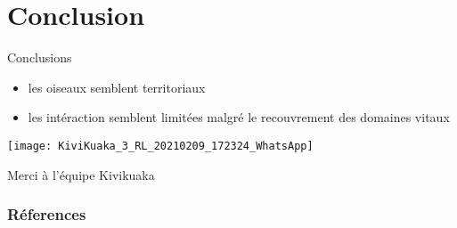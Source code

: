 \documentclass[10pt]{beamer}
\begin{document}
\section{Conclusion}

\begin{frame}{Conclusions}
  \begin{itemize}
  \item les oiseaux semblent territoriaux
  \item les intéraction semblent limitées malgré le recouvrement des
    domaines vitaux
  \end{itemize}
\end{frame}




\begin{frame}[plain]
  \begin{center}
    \texttt{[image: KiviKuaka\_3\_RL\_20210209\_172324\_WhatsApp]} \\
    \begin{Large}
      Merci à l'équipe Kivikuaka   
    \end{Large}
  \end{center}
\end{frame}


\begin{frame}[allowframebreaks]
  \begin{tiny}
    \frametitle{Réferences}
    
    
  \end{tiny}
\end{frame}
\end{document}
